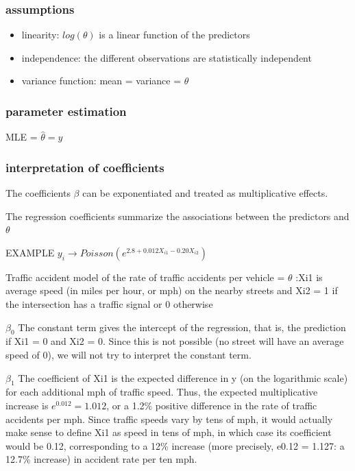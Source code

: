 \documentclass[
]{article}
\providecommand{\tightlist}{%
  \setlength{\itemsep}{0pt}\setlength{\parskip}{0pt}}
\begin{document}
\hypertarget{assumptions-2}{%
\subsubsection{assumptions}\label{assumptions-2}}

\begin{itemize}
\tightlist
\item
  linearity: \(log(\theta)\) is a linear function of the predictors
\item
  independence: the different observations are statistically independent
\item
  variance function: mean = variance = \(\theta\)
\end{itemize}

\hypertarget{parameter-estimation-2}{%
\subsubsection{parameter estimation}\label{parameter-estimation-2}}

MLE = \(\hat{\theta}= y\)

\hypertarget{interpretation-of-coefficients-2}{%
\subsubsection{interpretation of
coefficients}\label{interpretation-of-coefficients-2}}

The coefficients \(\beta\) can be exponentiated and treated as
multiplicative effects.

The regression coefficients summarize the associations between the
predictors and \(\theta\)

EXAMPLE \(y_i \to Poisson(e^{2.8+ 0.012X_{i1} - 0.20X_{i2}})\)

Traffic accident model of the rate of traffic accidents per vehicle =
\(\theta\) :Xi1 is average speed (in miles per hour, or mph) on the
nearby streets and Xi2 = 1 if the intersection has a traffic signal or 0
otherwise

\(\beta_0\) The constant term gives the intercept of the regression,
that is, the prediction if Xi1 = 0 and Xi2 = 0. Since this is not
possible (no street will have an average speed of 0), we will not try to
interpret the constant term.

\(\beta_1\) The coefficient of Xi1 is the expected difference in y (on
the logarithmic scale) for each additional mph of traffic speed. Thus,
the expected multiplicative increase is \(e^{0.012} = 1.012\), or a
1.2\% positive difference in the rate of traffic accidents per mph.
Since traffic speeds vary by tens of mph, it would actually make sense
to define Xi1 as speed in tens of mph, in which case its coefficient
would be 0.12, corresponding to a 12\% increase (more precisely, e0.12 =
1.127: a 12.7\% increase) in accident rate per ten mph.
\end{document}
